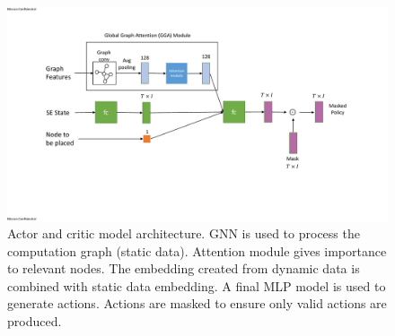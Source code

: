 \begin{figure}[h]
  \centering
  \includegraphics[width=\textwidth]{fig/model_diagram.pdf}
  \caption{Actor and critic model architecture. GNN is used to process the computation graph (static data). 
  Attention module gives importance to relevant nodes. The embedding created from dynamic data is combined with static data embedding. 
  A final MLP model is used to generate actions. Actions are masked to ensure only valid actions are produced. }
  \label{fig:model}
\end{figure}

